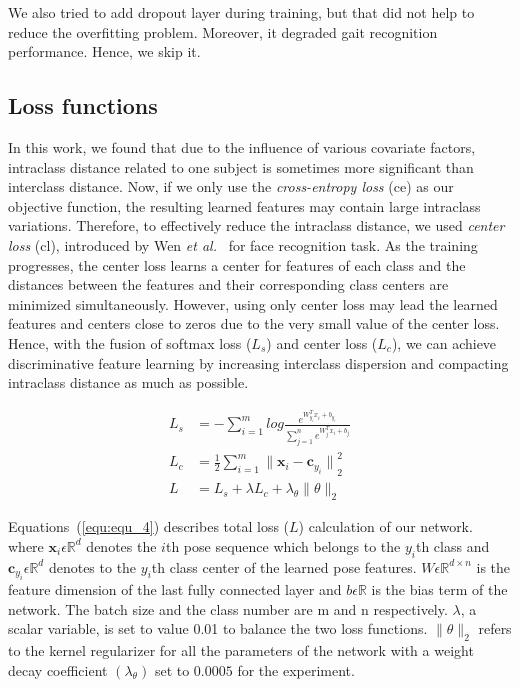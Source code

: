 We also tried to add dropout layer during training, but that did not help to reduce the overfitting problem. Moreover, it degraded gait recognition performance. Hence, we skip it.


\subsection{Loss functions}
In this work, we found that due to the influence of various covariate factors, intraclass distance related to one subject is sometimes more significant than interclass distance. Now, if we only use the \textit{cross-entropy loss} (\gls{ce}) as our objective function, the resulting learned features may contain large intraclass variations. Therefore, to effectively reduce the intraclass distance, we used \textit{center loss} (\gls{cl}), introduced by Wen \textit{et al.}~\cite{Wen_16} for face recognition task. As the training progresses, the center loss learns a center for features of each class and the distances between the features and their corresponding class centers are minimized simultaneously. However, using only center loss may lead the learned features and centers close to zeros due to the very small value of the center loss. Hence, with the fusion of softmax loss ($L_s$) and center loss ($L_c$), we can achieve discriminative feature learning by increasing interclass dispersion and compacting intraclass distance as much as possible.


\begin{equation}
\label{equ:equ_4}
\begin{split}
L_s &=-\sum_{i=1}^{m}log{\frac{e^{W_{y_i}^{T}x_i + b_{y_i}}}{\sum_{j=1}^{n}{e^{W_{j}^{T}x_i+ b_j}}}} \\
L_c &= \frac{1}{2}\sum_{i=1}^{m}{\parallel{{\boldsymbol x_i}-{\boldsymbol c_{y_i}}}\parallel}_2^2 \\
L &= L_s + \lambda L_c + \lambda_{\theta}\parallel{\theta}\parallel_{2}
\end{split} 
\end{equation}

Equations~(\ref{equ:equ_4}) describes total loss ($ L $) calculation of our network. where $\boldsymbol x_{i} \epsilon \mathbb {R}^d$ denotes the $i$th pose sequence which belongs to the $y_i$th class and  $\boldsymbol c_{y_i} \epsilon \mathbb {R}^d$ denotes to the $y_i$th class center of the learned pose features. $W \epsilon \mathbb {R}^{d\times n}$ is the feature dimension of the last fully connected layer and $b\epsilon \mathbb {R}$ is the bias term of the network. The batch size and the class number are m and n respectively. $\lambda$, a scalar variable, is set to value 0.01 to balance the two loss functions. $\parallel{\theta}\parallel_{2}$ refers to the kernel regularizer for all the parameters of the network with a weight decay coefficient $(\lambda_{\theta})$ set to $0.0005$ for the experiment.  


